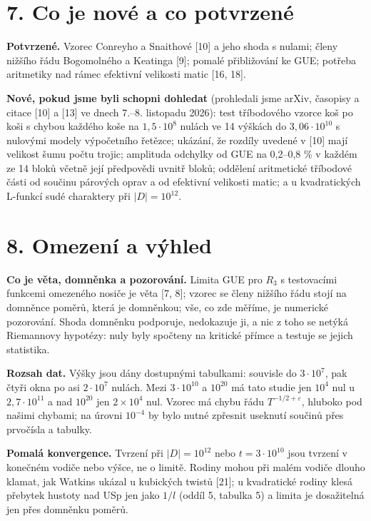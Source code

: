 \documentclass[
  10pt,
]{article}
\begin{document}
\hypertarget{co-je-novuxe9-a-co-potvrzenuxe9}{%
\section{7. Co je nové a co
potvrzené}\label{co-je-novuxe9-a-co-potvrzenuxe9}}

\textbf{Potvrzené.} Vzorec Conreyho a Snaithové {[}10{]} a jeho shoda s
nulami; členy nižšího řádu Bogomolného a Keatinga {[}9{]}; pomalé
přibližování ke GUE; potřeba aritmetiky nad rámec efektivní velikosti
matic {[}16, 18{]}.

\textbf{Nové, pokud jsme byli schopni dohledat} (prohledali jsme arXiv,
časopisy a citace {[}10{]} a {[}13{]} ve dnech 7.--8. listopadu 2026):
test tříbodového vzorce koš po koši s chybou každého koše na
\(1{,}5\cdot10^8\) nulách ve 14 výškách do \(3{,}06\cdot10^{10}\) s
nulovými modely výpočetního řetězce; ukázání, že rozdíly uvedené v
{[}10{]} mají velikost šumu počtu trojic; amplituda odchylky od GUE na
0,2--0,8 \% v každém ze 14 bloků včetně její předpovědi uvnitř bloků;
oddělení aritmetické tříbodové části od součinu párových oprav a od
efektivní velikosti matic; a u kvadratických L-funkcí sudé charaktery
při \(|D| = 10^{12}\).

\hypertarget{omezenuxed-a-vuxfdhled}{%
\section{8. Omezení a výhled}\label{omezenuxed-a-vuxfdhled}}

\textbf{Co je věta, domněnka a pozorování.} Limita GUE pro \(R_3\) s
testovacími funkcemi omezeného nosiče je věta {[}7, 8{]}; vzorec se
členy nižšího řádu stojí na domněnce poměrů, která je domněnkou; vše, co
zde měříme, je numerické pozorování. Shoda domněnku podporuje,
nedokazuje ji, a nic z toho se netýká Riemannovy hypotézy: nuly byly
spočteny na kritické přímce a testuje se jejich statistika.

\textbf{Rozsah dat.} Výšky jsou dány dostupnými tabulkami: souvisle do
\(3\cdot10^7\), pak čtyři okna po asi \(2\cdot10^7\) nulách. Mezi
\(3\cdot10^{10}\) a \(10^{20}\) má tato studie jen \(10^4\) nul u
\(2{,}7\cdot10^{11}\) a nad \(10^{20}\) jen \(2 \times 10^4\) nul.
Vzorec má chybu řádu \(T^{-1/2+\varepsilon}\), hluboko pod našimi
chybami; na úrovni \(10^{-4}\) by bylo nutné zpřesnit useknutí součinů
přes prvočísla a tabulky.

\textbf{Pomalá konvergence.} Tvrzení při \(|D| = 10^{12}\) nebo
\(t = 3\cdot10^{10}\) jsou tvrzení v konečném vodiče nebo výšce, ne o
limitě. Rodiny mohou při malém vodiče dlouho klamat, jak Watkins ukázal
u kubických twistů {[}21{]}; u kvadratické rodiny klesá přebytek hustoty
nad USp jen jako \(1/l\) (oddíl 5, tabulka 5) a limita je dosažitelná
jen přes domněnku poměrů.
\end{document}
